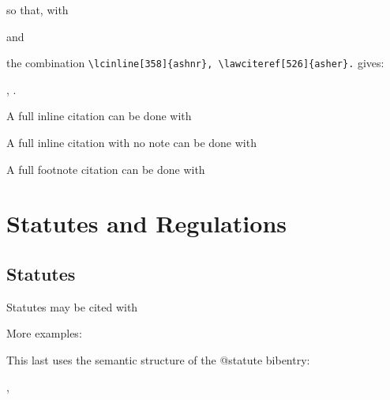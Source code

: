 so that, with
\begin{myquotation}\noindent
{}
\end{myquotation}
and
\begin{myquotation}\noindent
{}
\end{myquotation}
the combination \verb|\lcinline[358]{ashnr}, \lawciteref[526]{asher}.| gives:
\begin{myquotation}\noindent
{}, .
\end{myquotation}





\p A full inline citation can be done with \\ 

\p A full inline citation with no note can be done with \\ 

\p A full footnote citation can be done with \\ 

\section{Statutes and Regulations}
\subsection{Statutes}

\p Statutes may be cited with 


More examples:

\bigskip
{}\par\bigskip
{}\par\bigskip
{}\par\bigskip

This last uses the semantic structure of the @statute bibentry:\medskip

,   \medskip

